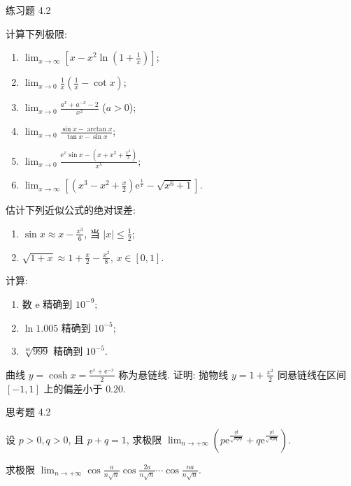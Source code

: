 \begin{exblock}{练习题 4.2}
\item 计算下列极限:
\begin{enumerate}[label=(\arabic*)]
  \item $\lim_{x\to\infty}\left[x-x^2\ln\left(1+\frac{1}{x}\right)\right]$;
  \item $\lim_{x\to 0}\frac{1}{x}\left(\frac{1}{x}-\cot x\right)$;
  \item $\lim_{x\to 0}\frac{a^x+a^{-x}-2}{x^2}$ ($a>0$);
  \item $\lim_{x\to 0}\frac{\sin x-\arctan x}{\tan x-\sin x}$;
  \item $\lim_{x\to 0}\frac{\mathrm{e}^x\sin x-\left(x+x^2+\frac{x^3}{3}\right)}{x^5}$;
  \item $\lim_{x\to\infty}\left[\left(x^3-x^2+\frac{x}{2}\right)\mathrm{e}^{\frac{1}{x}}-\sqrt{x^6+1}\right]$.
\end{enumerate}

\item 估计下列近似公式的绝对误差:
\begin{enumerate}[label=(\arabic*)]
  \item $\sin x \approx x - \frac{x^3}{6}$, 当 $|x|\leqslant \frac{1}{2}$;
  \item $\sqrt{1+x}\approx 1+\frac{x}{2}-\frac{x^2}{8}$, $x\in[0,1]$.
\end{enumerate}

\item 计算:
\begin{enumerate}[label=(\arabic*)]
  \item 数 $\mathrm{e}$ 精确到 $10^{-9}$;
  \item $\ln 1.005$ 精确到 $10^{-5}$;
  \item $\sqrt[10]{999}$ 精确到 $10^{-5}$.
\end{enumerate}

\item 曲线 $y=\cosh x = \frac{\mathrm{e}^x+\mathrm{e}^{-x}}{2}$ 称为悬链线. 证明: 抛物线 $y=1+\frac{x^2}{2}$ 同悬链线在区间 $[-1,1]$ 上的偏差小于 $0.20$.
\end{exblock}

\begin{exblock}{思考题 4.2}
\item 设 $p>0, q>0$, 且 $p+q=1$, 求极限 $\lim_{n\to+\infty}\left(p\mathrm{e}^{\frac{qt}{\sqrt{npq}}}+q\mathrm{e}^{\frac{pt}{\sqrt{npq}}}\right)$.
\item 求极限 $\lim_{n\to+\infty}\cos\frac{a}{n\sqrt{n}}\cos\frac{2a}{n\sqrt{n}}\cdots\cos\frac{na}{n\sqrt{n}}$.
\end{exblock}

